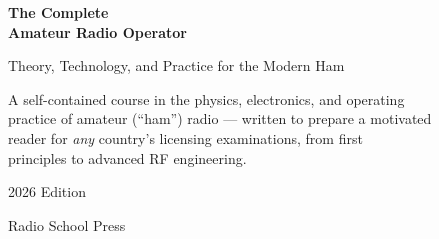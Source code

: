 \begin{titlepage}
\centering
\vspace*{1.2in}
{\Huge\bfseries\color{rblue} The Complete\\[4pt] Amateur Radio Operator\par}
\vspace{0.4in}
{\Large\color{rorange} Theory, Technology, and Practice for the Modern Ham\par}
\vspace{1in}
{\large A self-contained course in the physics, electronics, and operating\\
practice of amateur (``ham'') radio --- written to prepare a motivated\\
reader for \emph{any} country's licensing examinations, from first\\
principles to advanced RF engineering.\par}
\vfill
{\large 2026 Edition\par}
\vspace{0.2in}
{\normalsize Radio School Press\par}
\end{titlepage}
